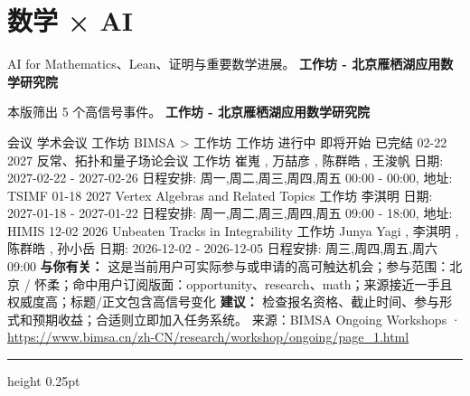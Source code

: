 \documentclass[10.5pt]{ctexart}
\begin{document}
\section*{数学 × AI}
{\color{ormuted} AI for Mathematics、Lean、证明与重要数学进展。}
\vspace{2mm}
{\LARGE\bfseries 工作坊 - 北京雁栖湖应用数学研究院}\par
\vspace{1mm}
{\color{ormuted} 本版筛出 5 个高信号事件。}
\vspace{3mm}
{\Large\bfseries 工作坊 - 北京雁栖湖应用数学研究院}\par
会议 学术会议 工作坊 BIMSA > 工作坊 工作坊 进行中 即将开始 已完结 02-22 2027 反常、拓扑和量子场论会议 工作坊 崔嵬 , 万喆彦 , 陈群皓 , 王浚帆 日期: 2027-02-22 - 2027-02-26 日程安排: 周一,周二,周三,周四,周五 00:00 - 00:00, 地址: TSIMF 01-18 2027 Vertex Algebras and Related Topics 工作坊 李淇明 日期: 2027-01-18 - 2027-01-22 日程安排: 周一,周二,周三,周四,周五 09:00 - 18:00, 地址: HIMIS 12-02 2026 Unbeaten Tracks in Integrability 工作坊 Junya Yagi , 李淇明 , 陈群皓 , 孙小岳 日期: 2026-12-02 - 2026-12-05 日程安排: 周三,周四,周五,周六 09:00
\textbf{与你有关：} 这是当前用户可实际参与或申请的高可触达机会；参与范围：北京 / 怀柔；命中用户订阅版面：opportunity、research、math；来源接近一手且权威度高；标题/正文包含高信号变化
\textbf{建议：} 检查报名资格、截止时间、参与形式和预期收益；合适则立即加入任务系统。
{\footnotesize\color{ormuted} 来源：BIMSA Ongoing Workshops · \url{https://www.bimsa.cn/zh-CN/research/workshop/ongoing/page_1.html}}
\vspace{4mm}
\hrule height 0.25pt
\vspace{3mm}
\end{document}
